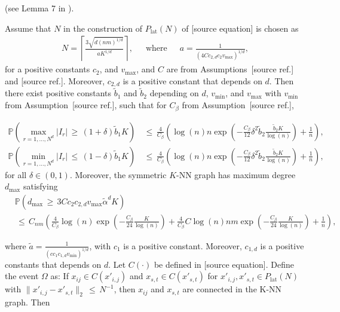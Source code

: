 \documentclass[twoside,11pt]{article}
\makeatletter
\newcommand{\discardlabel}[1]{}
\newcommand{\discardtwo}[2]{}
\newcommand{\legacyref}[1]{\textup{[source ref.]}}
\newcommand{\legacyeqref}[1]{\textup{[source equation]}}
\newenvironment{legacycomparison}{%
  \begingroup\color{legacygray}%
  \let\label\discardlabel
  \let\originallabel\discardlabel
  \let\ref\legacyref
  \let\pageref\legacyref
  \let\eqref\legacyeqref
  \let\cref\legacyref
  \let\Cref\legacyref
  \let\autoref\legacyref
  \let\aliasref\discardtwo
}{\endgroup}
\newcommand{\aliasref}[2]{%
  \@ifundefined{r@#2}{}{%
    \expandafter\let\csname r@#1\expandafter\endcsname\csname r@#2\endcsname}}
\makeatother
\begin{document}
\begin{legacycomparison}
\begin{lemma}(see Lemma 7 in \cite{madrid2020adaptive}).
    \label{lemma_14}
Assume that $N$ in the construction
of $P_\text{lat}(N)$ of \eqref{lat_g} is chosen as 
\begin{align}
\label{eq:N_definition}
N = \left\lceil \frac{ 3\sqrt{d(nm)^{1/d}} }{aK^{1/d}}\right\rceil, \quad \,\,\,\text{where}\,\,\,\quad  a = \frac{1}{(4Cc_{2,d}c_2v_{\max})^{1/d}},
\end{align} 
for a positive constants \(c_2\), and \(v_{\max}\), and \(C\) are from Assumptions~\ref{asm:m} and \ref{ass_1_1_1}. 
Moreover, \(c_{2,d}\) is a positive constant that depends on \(d\). Then there exist positive constants \(\tilde b_1\) and \(\tilde b_2\) depending on \(d\), \(v_{\min}\), and \(v_{\max}\) with \(v_{\min}\) from Assumption~\ref{Assumption 1.}, such that for \(C_{\beta}\) from Assumption~\ref{Assumption 1.},

\begin{align}
\mathbb{P}\left( \max_{r=1,\ldots,N^d} |I_r| \,\geq\, (1 + \delta)\tilde b_1K \right) &\,\leq\, \frac{4}{C_{\beta}} \left(\log(n)n\exp\left( -\frac{C_{\beta}}{12}\delta^2 \tilde b_2\frac{\tilde b_2K}{\log(n)} \right) + \frac{1}{n} \right),
\label{eq:max_Ir_bound}
\end{align}
\begin{align}
\mathbb{P}\left( \min_{r=1,\ldots,N^d} |I_r| \,\leq\, (1 - \delta)\tilde b_1K \right) &\,\leq\, \frac{4}{C_{\beta}} \left(\log(n)n\exp\left( -\frac{C_{\beta}}{12}\delta^2 \tilde b_2\frac{\tilde b_2K}{\log(n)} \right) + \frac{1}{n} \right),
\label{eq:min_Ir_bound}
\end{align}
for all \(\delta \in (0, 1)\). Moreover, the symmetric \(K\)-NN graph has maximum degree \(d_{\max}\) satisfying
\begin{align}
&\mathbb{P}(d_{\max} \,\geq\, 3Cc_2c_{2,d}v_{\text{max}}{\tilde \alpha}^dK) \nonumber \\&\,\leq\, C_{nm} \left(\frac{4}{C_{\beta}} \log(n)\exp\left(-\frac{C_{\beta}}{24}\frac{K}{\log(n)}\right) + \frac{4}{C_{\beta}}C\log(n)nm\exp\left(-\frac{C_{\beta}}{24}\frac{K}{\log(n)}\right) + \frac{1}{n}\right),
\label{eq:d_max_bound}
\end{align}

where $\tilde a = \frac{1}{(cc_1c_{1,d}v_{\min})^{1/d}}$, with $c_1$ is a positive constant. 
Moreover, \( c_{1,d} \) is a positive constants that depends on \( d \). Let $C(\cdot)$ be defined in \eqref{knn_center}. 
Define the event $\Omega$ as: If \(x_{ij} \in C(x'_{i,j})\) and \(x_{s,t} \in C(x'_{s,t})\) for \(x'_{i,j}, x'_{s,t} \in P_{\text{lat}}(N)\) with \(\|x'_{i,j} - x'_{s,t}\|_2 \,\leq\, N^{-1}\), then \( x_{ij} \) and \( x_{s,t} \) are connected in the K-NN graph. Then


\end{lemma}
\end{legacycomparison}
\end{document}

